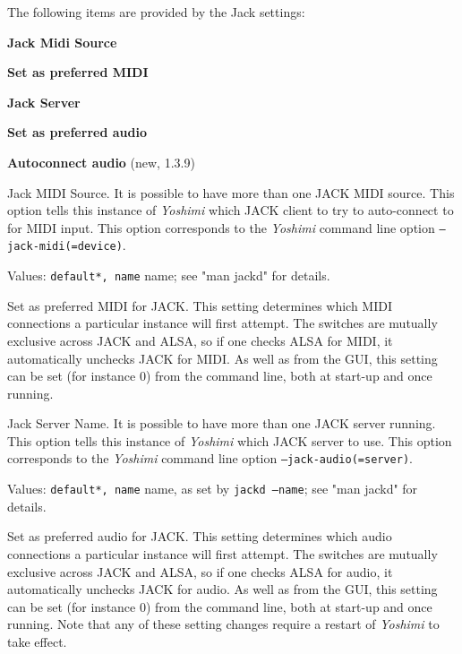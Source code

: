    The following items are provided by the Jack settings:

   \begin{enumber}
      \item \textbf{Jack Midi Source}
      \item \textbf{Set as preferred MIDI}
      \item \textbf{Jack Server}
      \item \textbf{Set as preferred audio}
      \item \textbf{Autoconnect audio} (new, 1.3.9)
   \end{enumber}

   \setcounter{ItemCounter}{0}      %

   Jack MIDI Source.
   It is possible to have more than one JACK MIDI source.  This option
   tells this instance of \textsl{Yoshimi} which JACK
   client to try to auto-connect to for MIDI input.
   This option corresponds to the \textsl{Yoshimi} command line option
   \texttt{--jack-midi(=device)}.

   Values: \texttt{default*, name} name; see "man jackd" for details.

   Set as preferred MIDI for JACK.
   This setting determines which MIDI connections a particular instance will
   first attempt. The switches are mutually exclusive across JACK and ALSA,
   so if one checks ALSA for MIDI, it automatically unchecks JACK for MIDI.
   As well as from the GUI, this setting can be set (for instance 0) from the
   command line, both at start-up and once running.

   Jack Server Name.
   It is possible to have more than one JACK server running.  This option
   tells this instance of \textsl{Yoshimi} which JACK server to use.
   This option corresponds to the \textsl{Yoshimi} command line option
   \texttt{--jack-audio(=server)}.

   Values: \texttt{default*, name} name, as set by
   \texttt{jackd --name}; see "man jackd" for details.

   Set as preferred audio for JACK.
   This setting determines which audio connections a particular instance will
   first attempt. The switches are mutually exclusive across JACK and ALSA,
   so if one checks ALSA for audio, it automatically unchecks JACK for audio.
   As well as from the GUI, this setting can be set (for instance 0) from the
   command line, both at start-up and once running.
   Note that any of these setting changes require a restart of \textsl{Yoshimi}
   to take effect.

